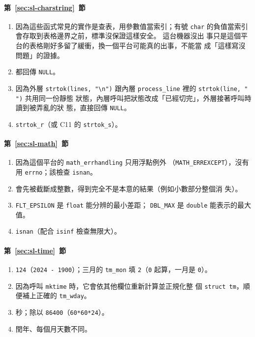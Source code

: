 \paragraph{第~\ref{sec:sl-charstring}~節}
\begin{enumerate}
\item 因為這些函式常見的實作是查表，用參數值當索引；有號 \texttt{char}
的負值當索引會存取到表格邊界之前，標準沒保證這樣安全。 這台機器沒出
事只是這個平台的表格剛好多留了緩衝，換一個平台可能真的出事，不能當
成「這樣寫沒問題」的證據。
\item 都回傳 \texttt{NULL}。
\item 因為外層 \texttt{strtok(lines, "\textbackslash n")} 跟內層
\texttt{process\_line} 裡的 \texttt{strtok(line, " ")} 共用同一份靜態
狀態，內層呼叫把狀態改成「已經切完」，外層接著呼叫時讀到被弄亂的狀
態，直接回傳 \texttt{NULL}。
\item \texttt{strtok\_r}（或 C11 的 \texttt{strtok\_s}）。
\end{enumerate}

\paragraph{第~\ref{sec:sl-math}~節}
\begin{enumerate}
\item 因為這個平台的 \texttt{math\_errhandling} 只用浮點例外
（\texttt{MATH\_ERREXCEPT}），沒有用 \texttt{errno}；該檢查
\texttt{isnan}。
\item 會先被截斷成整數，得到完全不是本意的結果（例如小數部分整個消
失）。
\item \texttt{FLT\_EPSILON} 是 \texttt{float} 能分辨的最小差距；
\texttt{DBL\_MAX} 是 \texttt{double} 能表示的最大值。
\item \texttt{isnan}（配合 \texttt{isinf} 檢查無限大）。
\end{enumerate}

\paragraph{第~\ref{sec:sl-time}~節}
\begin{enumerate}
\item \texttt{124}（\texttt{2024 - 1900}）；三月的 \texttt{tm\_mon}
填 \texttt{2}（\texttt{0} 起算，一月是 \texttt{0}）。
\item 因為呼叫 \texttt{mktime} 時，它會依其他欄位重新計算並正規化整
個 \texttt{struct tm}，順便補上正確的 \texttt{tm\_wday}。
\item 秒；除以 \texttt{86400}（\texttt{60*60*24}）。
\item 閏年、每個月天數不同。
\end{enumerate}

